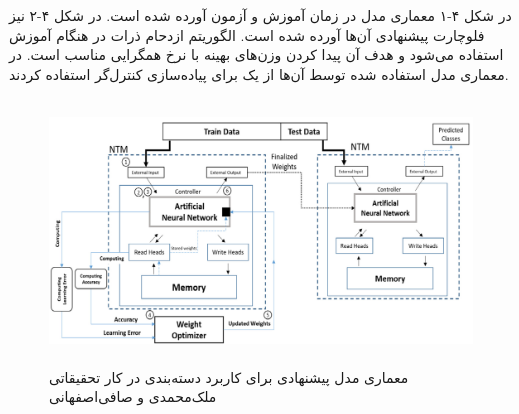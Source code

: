 در شکل ۴-۱ معماری مدل در زمان آموزش و آزمون آورده شده است. در شکل ۴-۲ نیز فلوچارت پیشنهادی آن‌ها آورده شده است. الگوریتم ازدحام ذرات در هنگام آموزش استفاده می‌شود و هدف آن پیدا کردن وزن‌های بهینه با نرخ همگرایی مناسب است. در معماری مدل استفاده شده توسط آن‌ها از یک  برای پیاده‌سازی کنترل‌گر استفاده کردند.\cite{faradonbe2020classifier}

\begin{figure}[!h]
\begin{center}
\includegraphics[height=7cm]{PSO-NTM-2.png}
\end{center}
\caption{معماری مدل پیشنهادی برای کاربرد دسته‌بندی در کار تحقیقاتی ملک‌محمدی و صافی‌اصفهانی \cite{faradonbe2020classifier}} 
\end{figure}

